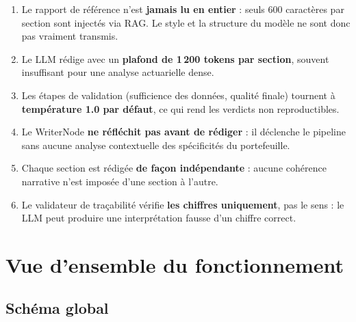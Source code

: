 \documentclass[12pt,a4paper]{article}
\begin{document}
\begin{weaknessbox}
\begin{enumerate}[leftmargin=1.5em, itemsep=3pt]
  \item Le rapport de référence n'est \textbf{jamais lu en entier} : seuls 600 caractères
        par section sont injectés via RAG. Le style et la structure du modèle ne sont
        donc pas vraiment transmis.
  \item Le LLM rédige avec un \textbf{plafond de 1\,200 tokens par section}, souvent
        insuffisant pour une analyse actuarielle dense.
  \item Les étapes de validation (sufficience des données, qualité finale) tournent à
        \textbf{température 1.0 par défaut}, ce qui rend les verdicts non reproductibles.
  \item Le WriterNode \textbf{ne réfléchit pas avant de rédiger} : il déclenche le pipeline
        sans aucune analyse contextuelle des spécificités du portefeuille.
  \item Chaque section est rédigée \textbf{de façon indépendante} : aucune cohérence narrative
        n'est imposée d'une section à l'autre.
  \item Le validateur de traçabilité vérifie \textbf{les chiffres uniquement}, pas le sens :
        le LLM peut produire une interprétation fausse d'un chiffre correct.
\end{enumerate}
\end{weaknessbox}

\newpage

\section{Vue d'ensemble du fonctionnement}

\subsection{Schéma global}
\end{document}
